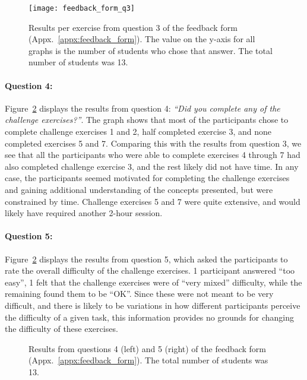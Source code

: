 \begin{figure}[htp]
	\centering
	\texttt{[image: feedback\_form\_q3]}
	\caption[Results from feedback form question 3]{Results per exercise from question 3 of the feedback form (Appx.~\ref{appx:feedback_form}). The value on the y-axis for all graphs is the number of students who chose that answer. The total number of students was 13.}
	\label{fig:feedback_form_q3}
\end{figure}

\paragraph{Question 4:} Figure~\ref{fig:feedback_form_q45} displays the results from question 4: \emph{``Did you complete any of the challenge exercises?''}. The graph shows that most of the participants chose to complete challenge exercises 1 and 2, half completed exercise 3, and none completed exercises 5 and 7. Comparing this with the results from question 3, we see that all the participants who were able to complete exercises 4 through 7 had also completed challenge exercise 3, and the rest likely did not have time. In any case, the participants seemed motivated for completing the challenge exercises and gaining additional understanding of the concepts presented, but were constrained by time. Challenge exercises 5 and 7 were quite extensive, and would likely have required another 2-hour session.

\paragraph{Question 5:} Figure~\ref{fig:feedback_form_q45} displays the results from question 5, which asked the participants to rate the overall difficulty of the challenge exercises. 1 participant answered ``too easy'', 1 felt that the challenge exercises were of ``very mixed'' difficulty, while the remaining found them to be ``OK''. Since these were not meant to be very difficult, and there is likely to be variations in how different participants perceive the difficulty of a given task, this information provides no grounds for changing the difficulty of these exercises.

\begin{figure}[htp]
	\caption[Results from feedback form questions 4 and 5]{Results from questions 4 (left) and 5 (right) of the feedback form (Appx.~\ref{appx:feedback_form}). The total number of students was 13.}
	\label{fig:feedback_form_q45}
\end{figure}


